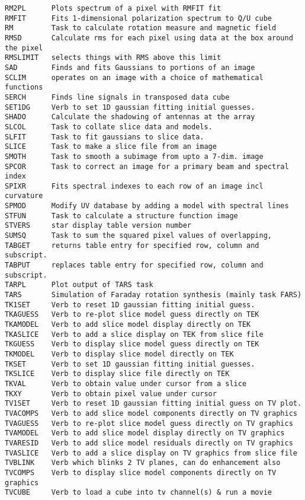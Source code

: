 \begin{verbatim}
RM2PL      Plots spectrum of a pixel with RMFIT fit
RMFIT      Fits 1-dimensional polarization spectrum to Q/U cube
RM         Task to calculate rotation measure and magnetic field
RMSD       Calculate rms for each pixel using data at the box around the pixel
RMSLIMIT   selects things with RMS above this limit
SAD        Finds and fits Gaussians to portions of an image
SCLIM      operates on an image with a choice of mathematical functions
SERCH      Finds line signals in transposed data cube
SET1DG     Verb to set 1D gaussian fitting initial guesses.
SHADO      Calculate the shadowing of antennas at the array
SLCOL      Task to collate slice data and models.
SLFIT      Task to fit gaussians to slice data.
SLICE      Task to make a slice file from an image
SMOTH      Task to smooth a subimage from upto a 7-dim. image
SPCOR      Task to correct an image for a primary beam and spectral index
SPIXR      Fits spectral indexes to each row of an image incl curvature
SPMOD      Modify UV database by adding a model with spectral lines
STFUN      Task to calculate a structure function image
STVERS     star display table version number
SUMSQ      Task to sum the squared pixel values of overlapping,
TABGET     returns table entry for specified row, column and subscript.
TABPUT     replaces table entry for specified row, column and subscript.
TARPL      Plot output of TARS task
TARS       Simulation of Faraday rotation synthesis (mainly task FARS)
TK1SET     Verb to reset 1D gaussian fitting initial guess.
TKAGUESS   Verb to re-plot slice model guess directly on TEK
TKAMODEL   Verb to add slice model display directly on TEK
TKASLICE   Verb to add a slice display on TEK from slice file
TKGUESS    Verb to display slice model guess directly on TEK
TKMODEL    Verb to display slice model directly on TEK
TKSET      Verb to set 1D gaussian fitting initial guesses.
TKSLICE    Verb to display slice file directly on TEK
TKVAL      Verb to obtain value under cursor from a slice
TKXY       Verb to obtain pixel value under cursor
TV1SET     Verb to reset 1D gaussian fitting initial guess on TV plot.
TVACOMPS   Verb to add slice model components directly on TV graphics
TVAGUESS   Verb to re-plot slice model guess directly on TV graphics
TVAMODEL   Verb to add slice model display directly on TV graphics
TVARESID   Verb to add slice model residuals directly on TV graphics
TVASLICE   Verb to add a slice display on TV graphics from slice file
TVBLINK    Verb which blinks 2 TV planes, can do enhancement also
TVCOMPS    Verb to display slice model components directly on TV graphics
TVCUBE     Verb to load a cube into tv channel(s) & run a movie

\end{verbatim}
